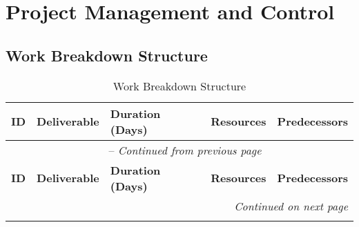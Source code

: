 \chapter{Project Management and Control}
\section{Work Breakdown Structure}
\begin{longtable}{|c|m{4cm}|>{\centering}m{1.75cm}|m{3.5cm}|m{4cm}|}
	\caption{Work Breakdown Structure}
	\label{table:primary} \\
	\hline \textbf{ID} & \textbf{Deliverable} & \textbf{Duration (Days)} & \textbf{Resources} & \textbf{Predecessors} \\ \hline
	\endfirsthead
	\multicolumn{5}{c}{\tablename\ \thetable\ -- \textit{Continued from previous page}} \\ \hline
	\textbf{ID} & \textbf{Deliverable} & \textbf{Duration (Days)} & \textbf{Resources} & \textbf{Predecessors} \\ \hline
	\endhead 
	\multicolumn{5}{r}{\textit{Continued on next page}} \\
	\endfoot \hline
	\endlastfoot


\end{longtable}
